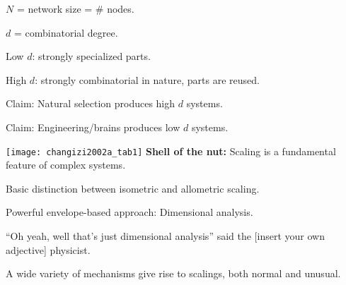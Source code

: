       $N$ = network size = \# nodes.
    
      $d$ = combinatorial degree.
    
      Low $d$: strongly specialized parts.
    
      High $d$: strongly combinatorial in nature, parts are reused. 
    
      Claim: Natural selection produces high $d$ systems.
    
      Claim: Engineering/brains produces low $d$ systems.
  
  
    \texttt{[image: changizi2002a\_tab1]}
  \textbf{Shell of the nut:}
      Scaling is a fundamental feature of complex systems.
    
      Basic distinction between isometric and allometric scaling.
    
      Powerful envelope-based approach: Dimensional analysis.
    
      ``Oh yeah, well that's just dimensional analysis'' said the [insert
      your own adjective] physicist.
    
      A wide variety of mechanisms give rise to scalings, 
      both normal and unusual.

